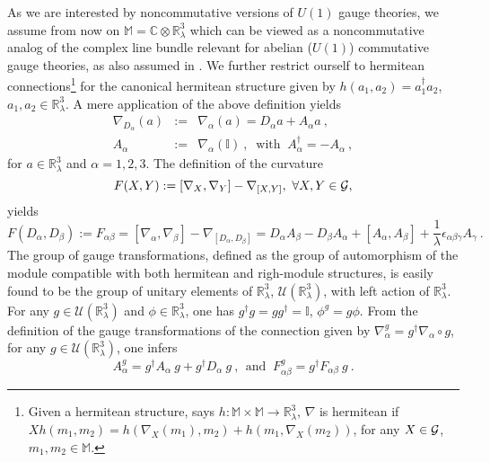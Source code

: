 \documentclass[a4paper,11pt,twoside]{article}
\numberwithin{equation}{section}
\newcommand\bbone{{ \mathbb{I}}}
\theoremstyle{nonumberplain}
\newcounter{and}
\begin{document}
%
As we are interested by noncommutative versions of $U(1)$ gauge theories, we assume from now on $\mathbb{M} = \mathbb{C}\otimes\mathbb{R}^3_\lambda$ which can be viewed as a noncommutative analog of the complex line bundle relevant for abelian ($U(1)$) commutative gauge theories, as also assumed in \cite{gervitwal-13}. We further restrict ourself to hermitean connections{\footnote{Given a hermitean structure, says $h:\mathbb{M}\times\mathbb{M}\to\mathbb{R}^3_\lambda$, $\nabla$ is hermitean if $Xh(m_1,m_2)=h(\nabla_X(m_1),m_2)+h(m_1,\nabla_X(m_2))$, for any $X\in{\cal{G}}$, $m_1,m_2\in\mathbb{M}$.}} for the canonical hermitean structure given by $h(a_1,a_2)=a_1^\dag a_2$, $a_1,a_2 \in \mathbb{R}^3_\lambda$. A mere application of the above definition yields%
%
\begin{eqnarray}
\nabla_{D_\alpha}(a) &:=& \nabla_\alpha(a) = D_\alpha a + A_\alpha a \ , \nonumber \\
A_\alpha &:=& \nabla_\alpha(\bbone) \ , \ \mbox{ with } \ A_\alpha^\dag = - A_\alpha \ , \label{connection}
\end{eqnarray}
%
for $a\in\mathbb{R}^3_\lambda$ and $\alpha = 1,2,3$. The definition of the curvature 
\begin{equation*}
F(X,Y):=[\nabla_X,\nabla_Y]-\nabla_{[X,Y]},\ \forall X,Y\in{\cal{G}}, 
\end{equation*}
%
yields%
%
\begin{equation}
F(D_\alpha,D_\beta) := F_{\alpha\beta} = \left[\nabla_\alpha,\nabla_\beta\right] - \nabla_{\left[D_\alpha,D_\beta\right]} = D_\alpha A_\beta - D_\beta A_\alpha + \left[A_\alpha,A_\beta\right] + \frac{1}{\lambda} \epsilon_{\alpha\beta\gamma} A_\gamma \ . \label{curv1}
\end{equation}
%
The group of gauge transformations, defined as the group of automorphism of the module compatible with both hermitean and righ-module structures, is easily found to be the group of unitary elements of $\mathbb{R}^3_\lambda$, $\mathcal{U}(\mathbb{R}^3_\lambda)$, with left action of $\mathbb{R}^3_\lambda$. For any $g\in\mathcal{U}(\mathbb{R}^3_\lambda)$ and $\phi\in\mathbb{R}^3_\lambda$, one has $g^\dag g=gg^\dag=\bbone$, $\phi^g=g\phi$. From the definition of the gauge transformations of the connection given by $\nabla_\alpha^g=g^\dag\nabla_\alpha\circ g$, for any $g\in\mathcal{U}(\mathbb{R}^3_\lambda)$, one infers%
%
\begin{equation}
A_\alpha^g = g^\dag A_\alpha \ g + g^\dag D_\alpha \ g \ , \ \ \mbox{and } \ F^g_{\alpha\beta} = g^\dag F_{\alpha\beta} \ g \ .
\end{equation}
\end{document}
